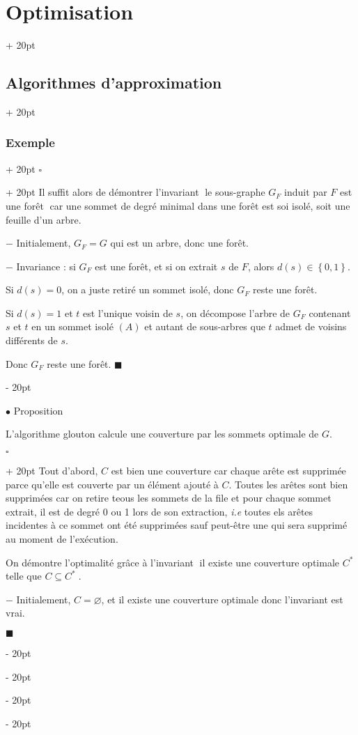 \documentclass[a4paper, 12pt, twoside]{article}
\newcommand{\set}[1]{\left\{ #1 \right\}}
\newcommand{\simplecit}[1]{\guillemotleft$\;$#1$\;$\guillemotright}
\newcommand{\ind}[1][20pt]{\advance\leftskip + #1}
\newcommand{\deind}[1][20pt]{\advance\leftskip - #1}
\newenvironment{indt}[2][20pt]{#2 \par \ind[#1]}{\par \deind} %
\newenvironment{proof}[1][{}]{\begin{indt}{$\square$ #1}}{$\blacksquare$ \end{indt}}
\newcommand{\1}{\mathbbm 1}
\begin{document}
\begin{indt}{\section{Optimisation}}
\begin{indt}{\subsection{Algorithmes d'approximation}}
\begin{indt}{\subsubsection{Exemple}}
\begin{proof}
                    Il suffit alors de démontrer l'invariant \simplecit{le sous-graphe $G_F$ induit par $F$ est une forêt} car une sommet de degré minimal dans une forêt est soi isolé, soit une feuille d'un arbre.

                    $-$ Initialement, $G_F = G$ qui est un arbre, donc une forêt.

                    $-$ Invariance : si $G_F$ est une forêt, et si on extrait $s$ de $F$,
                    alors $d(s) \in \set{0, 1}$.

                    Si $d(s) = 0$, on a juste retiré un sommet isolé, donc $G_F$ reste une forêt.

                    Si $d(s) = 1$ et $t$ est l'unique voisin de $s$, on décompose l'arbre de $G_F$ contenant $s$ et $t$ en un sommet isolé $(A)$ et autant de sous-arbres que $t$ admet de voisins différents de $s$.

                    Donc $G_F$ reste une forêt.
                \end{proof}

                \vspace{12pt}
                
                $\bullet$ Proposition
                \begin{emphBox}
                    L'algorithme glouton calcule une couverture par les sommets optimale de $G$.
                \end{emphBox}

                \vspace{6pt}
                
                \begin{proof}
                    Tout d'abord, $C$ est bien une couverture car chaque arête est supprimée parce qu'elle est couverte par un élément ajouté à $C$.
                    Toutes les arêtes sont bien supprimées car on retire teous les sommets de la file et pour chaque sommet extrait, il est de degré 0 ou 1 lors de son extraction, \textit{i.e} toutes els arêtes incidentes à ce sommet ont été supprimées sauf peut-être une qui sera supprimé au moment de l'exécution.

                    \vspace{12pt}
                    
                    On démontre l'optimalité grâce à l'invariant \simplecit{il existe une couverture optimale $C^*$ telle que $C \subseteq C^*$}.

                    $-$ Initialement, $C = \varnothing$, et il existe une couverture optimale donc l'invariant est vrai.


\end{proof}
\end{indt}
\end{indt}
\end{indt}
\end{document}
